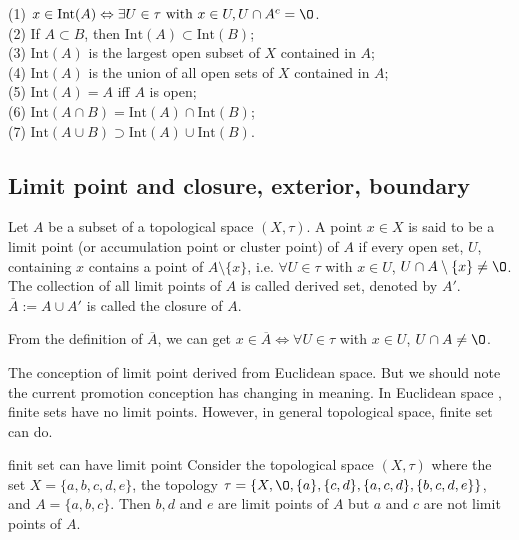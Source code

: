 \begin{proposition}{}{}
    (1) $x\in \text{Int}(A) \Leftrightarrow \exists U\in \tau \text{ with } x\in U, U\cap A^c=\O$. \\
    (2) If $A\subset B$, then $\text{Int}(A)\subset \text{Int}(B)$;\\
    (3) $\text{Int}(A)$ is the largest open subset of $X$ contained in $A$;\\
    (4) $\text{Int}(A)$ is the union of all open sets of $X$ contained in $A$;\\
    (5) $\text{Int}(A)=A$ iff $A$ is open;\\
    (6) $\text{Int}(A\cap B) = \text{Int}(A)\cap \text{Int}(B)$;\\ 
    (7) $\text{Int}(A\cup B) \supset\text{Int}(A)\cup \text{Int}(B)$.
\end{proposition}




\subsection{Limit point and closure, exterior, boundary}

\begin{definition}{}{}
    Let $A$ be a subset of a topological space $(X,\tau)$. A point $x\in X$ is said to be a limit point (or accumulation point or cluster point) of 
    $A$ if every open set, $U$, containing $x$ contains a point of $A\setminus\{x\}$, i.e. $\forall U\in\tau$ with $x\in U$, $U\cap A\setminus \{x\}\neq \O$.
    The collection of all limit points of $A$ is called derived set, denoted by $A'$. $\overline{A}:=A\cup A'$ is called the closure of $A$. 
\end{definition}

\begin{remark}
    From the definition of $\overline{A}$, we can get $x\in\overline{A}\Leftrightarrow \forall U\in \tau$ with $x\in U$, $U\cap A\neq \O$.
\end{remark}




The conception of limit point derived from Euclidean space. But we should note the current promotion conception has changing in meaning.
In Euclidean space , finite sets have no limit points. However, in general topological space, finite set can do.

\begin{example}{}{finit set can have limit point}
    Consider the topological space $(X,\tau)$ where the set $X=\{a,b,c,d,e\}$, the topology $\tau=\{X,\O, \{a\}, \{c,d\},\{a,c,d\},\{b,c,d,e\}\}$, 
    and $A=\{a,b,c\}$. Then $b,d$ and $e$ are limit points of $A$ but $a$ and $c$ are not limit points of $A$. 
\end{example}

